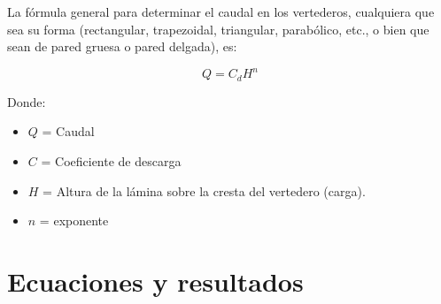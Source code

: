 \documentclass[10pt, a4paper]{exam}
\begin{document}
La fórmula general para determinar el caudal en los vertederos, cualquiera que sea su forma (rectangular, trapezoidal, triangular, parabólico, etc., o bien que sean de pared gruesa o pared delgada), es:

\begin{equation}
    Q = C_d H^n
    \label{ecu:general}
\end{equation}

Donde:  

\begin{itemize}
    \item $Q$ = Caudal 
    \item $C$ = Coeficiente de descarga
    \item $H$ = Altura de la lámina sobre la cresta del vertedero (carga).
    \item $n$ = exponente
\end{itemize}


\section{Ecuaciones y resultados}
\end{document}
